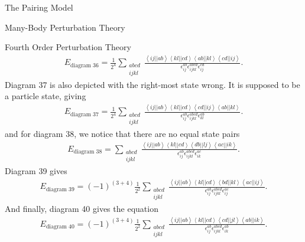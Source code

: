 \documentclass[twoside,english]{uiofysmaster}
\begin{document}
\begin{chapter}{The Pairing Model}
\begin{section}{Many-Body Perturbation Theory}
\begin{subsection}{Fourth Order Perturbation Theory}
			\begin{align}
				E_{\text{diagram 36}} = \frac{1}{2^4} \sum_{\substack{abcd\\ijkl}} \frac{ \left<ij||ab\right>\left<kl||cd\right>\left<ab||kl\right>\left<cd||ij\right> }{ \epsilon_{ij}^{ab} \epsilon_{ijkl}^{abcd} \epsilon_{ij}^{cd} }.
			\end{align}
			Diagram 37 is also depicted with the right-most state wrong. It is supposed to be a particle state, giving
			\begin{align}
				E_{\text{diagram 37}} = \frac{1}{2^4} \sum_{\substack{abcd\\ijkl}} \frac{ \left<ij||ab\right>\left<kl||cd\right>\left<cd||ij\right>\left<ab||kl\right> }{ \epsilon_{ij}^{ab} \epsilon_{ijkl}^{abcd} \epsilon_{kl}^{ab} }.
			\end{align}
			and for diagram 38, we notice that there are no equal state pairs
			\begin{align}
				E_{\text{diagram 38}} = \sum_{\substack{abcd\\ijkl}} \frac{ \left<ij||ab\right>\left<kl||cd\right>\left<db||lj\right>\left<ac||ik\right> }{ \epsilon_{ij}^{ab} \epsilon_{ijkl}^{abcd} \epsilon_{ik}^{ac} }.
			\end{align}
			Diagram 39 gives
			\begin{align}
				E_{\text{diagram 39}} = \left(-1\right)^{(3+4)} \frac{1}{2^2} \sum_{\substack{abcd\\ijkl}} \frac{ \left<ij||ab\right>\left<kl||cd\right>\left<bd||kl\right>\left<ac||ij\right> }{ \epsilon_{ij}^{ab} \epsilon_{ijkl}^{abcd} \epsilon_{ij}^{ac} }.
			\end{align}
			And finally, diagram 40 gives the equation
			\begin{align}
				E_{\text{diagram 40}} = \left(-1\right)^{(3+4)} \frac{1}{2^2} \sum_{\substack{abcd\\ijkl}} \frac{ \left<ij||ab\right>\left<kl||cd\right>\left<cd||jl\right>\left<ab||ik\right> }{ \epsilon_{ij}^{ab} \epsilon_{ijkl}^{abcd} \epsilon_{ik}^{ab} }.
			\end{align}
		\end{subsection}
 		
 	\end{section}


\end{chapter}
\end{document}
